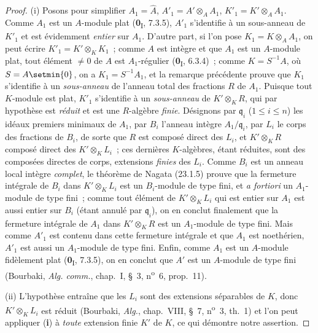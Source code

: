 \begin{proof}
(i) Posons pour simplifier $A_1=\widehat A$,
$A'_1=A'\otimes_AA_1$, $K'_1=K'\otimes_AA_1$. Comme $A_1$ est un
$A$-module plat (\textbf{0}\textsubscript{I}, 7.3.5), $A'_1$ s'identifie à un
sous-anneau de $K'_1$ et est évidemment \emph{entier} sur $A_1$. D'autre part, si
l'on pose $K_1=K\otimes_AA_1$, on peut écrire
$K'_1=K'\otimes_KK_1$~; comme $A$ est intègre et que $A_1$ est un $A$-module
plat, tout élément $\neq0$ de $A$ est $A_1$-régulier
(\textbf{0}\textsubscript{I}, 6.3.4)~; comme $K=S^{-1}A$, où $S=A\setmin\{0\}$, on a
$K_1=S^{-1}A_1$, et la remarque précédente prouve que $K_1$ s'identifie à un
\emph{sous-anneau} de l'anneau total des fractions $R$ de $A_1$. Puisque tout
$K$-module est plat, $K'_1$ s'identifie à un \emph{sous-anneau} de $K'\otimes_KR$,
qui par hypothèse est \emph{réduit} et est une $R$-algèbre \emph{finie}. Désignons par
$\mathfrak q_i$ ($1\leqslant i\leqslant n$) les idéaux premiers minimaux de
$A_1$, par $B_i$ l'anneau intègre $A_1/\mathfrak q_i$, par $L_i$ le corps des
fractions de $B_i$, de sorte que $R$ est composé direct des $L_i$, et
$K'\otimes_KR$ composé direct des $K'\otimes_KL_i$~; ces dernières
$K$-algèbres, étant réduites, sont des composées directes de corps,
extensions \emph{finies} des $L_i$. Comme $B_i$ est un anneau local intègre
\emph{complet}, le théorème de Nagata (23.1.5) prouve que la fermeture
intégrale de $B_i$ dans $K'\otimes_KL_i$ est un $B_i$-module de type fini, et
\emph{a fortiori} un $A_1$-module de type fini~; comme tout élément de
$K'\otimes_KL_i$ qui est entier sur $A_1$ est aussi entier sur $B_i$ (étant
annulé par $\mathfrak q_i$), on en conclut finalement que la fermeture
intégrale de $A_1$ dans $K'\otimes_KR$ est un $A_1$-module de type fini. Mais
comme $A'_1$ est contenu dans cette fermeture intégrale et que $A_1$ est
noethérien, $A'_1$ est aussi un $A_1$-module de type fini. Enfin, comme $A_1$
est un $A$-module fidèlement plat (\textbf{0}\textsubscript{I}, 7.3.5), on en conclut
que $A'$ est un $A$-module de type fini (Bourbaki, \emph{Alg. comm.},
chap.~I, §~3, n\textsuperscript{o}~6, prop.~11).


(ii) L'hypothèse entraîne que les $L_i$ sont des extensions séparables
de $K$, donc $K'\otimes_KL_i$ est réduit (Bourbaki, \emph{Alg.}, chap.~VIII,
§~7, n\textsuperscript{o}~3, th.~1) et l'on peut appliquer (\textbf{i}) à \emph{toute}
extension finie $K'$ de $K$, ce qui démontre notre assertion.
\end{proof}

